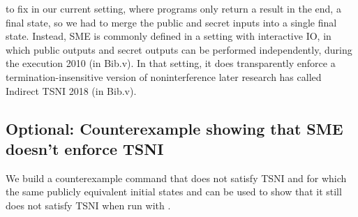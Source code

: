 \documentclass[12pt]{report}
\begin{document}
    to fix in our current setting, where programs only return a result
    in the end, a final state, so we had to merge the public and
    secret inputs into a single final state. Instead, SME is commonly
    defined in a setting with interactive IO, in which public outputs
    and secret outputs can be performed independently, during the
    execution    2010 (in Bib.v). In that setting, it
    does transparently enforce a termination-insensitive version of
    noninterference later research has called Indirect TSNI
       2018 (in Bib.v). 
\begin{coqdoccode}
\coqdocemptyline
\end{coqdoccode}
\subsection{Optional: Counterexample showing that SME doesn't enforce TSNI}



 We build a counterexample command that does not satisfy TSNI and
    for which the same publicly equivalent initial states  and
     can be used to show that it still does not satisfy TSNI when
    run with .
\end{document}
